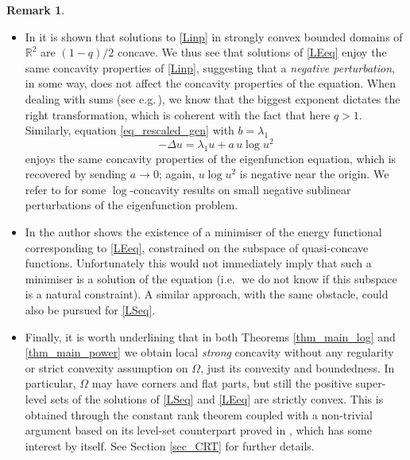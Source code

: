 \documentclass[12pt]{amsart}
\numberwithin{equation}{section}
\theoremstyle{plain}
\theoremstyle{plain}
\theoremstyle{plain}
\theoremstyle{definition}
\newtheorem{remark}[theorem]{Remark}
\newcommand{\R}{{\mathbb R}}
\begin{document}
\begin{remark}
\begin{itemize}[leftmargin=*]
We were not able to prove these properties and resort to a connected subset of $\,]1, 2^*-1[\ \times W^{1,2}_0(\Omega)$ made of general solutions of \eqref{LEeq}, rather than of ground states. 
The latter is obtained through degree methods, see Lemma \ref{lemmaconn}, and all these solutions have local degree $-1$. 
 \item
 In \cite{Lin94} it is shown that solutions to \eqref{Linp} in strongly convex bounded domains of $\R^2$ are $(1-q)/2$ concave.
We thus see that solutions of \eqref{LEeq} enjoy the same concavity properties of \eqref{Linp}, suggesting that a \emph{negative perturbation}, in some way, does not affect the concavity properties of the equation. 
When dealing with sums (see e.g.$\,$\cite[Corollary 6.6]{GaSq25}), we know that the biggest exponent dictates the right transformation, which is coherent with the fact that here $q>1$.
Similarly, equation \eqref{eq_rescaled_gen} 
with $b=\lambda_1$ 
$$-\Delta u = \lambda_1 u + a \, u \log 
u^2$$
 enjoys the same concavity properties of the eigenfunction equation, which is recovered by sending $a \to 0$; again, $u \log u^2$ is negative near the origin. 
We refer to \cite{HaNa25} for some $\log$-concavity results on small negative sublinear perturbations of the eigenfunction problem. 
 \item 
In \cite{Gom07} the author shows the existence of a minimiser of the energy functional corresponding to \eqref{LEeq}, constrained on the subspace of quasi-concave functions. 
Unfortunately this would not immediately imply that such a minimiser is a solution of the equation (i.e.$\;$ we do not know if this subspace is a natural constraint). 
A similar approach, with the same obstacle, could also be pursued for \eqref{LSeq}.
\item
Finally, it is worth underlining that in both Theorems \ref{thm_main_log} and \ref{thm_main_power} we obtain local \emph{strong} concavity without any regularity or strict convexity assumption on $\Omega$, just its convexity and boundedness. 
In particular, $\Omega$ may have corners and flat parts, but still the positive super-level sets of the solutions of \eqref{LSeq} and \eqref{LEeq} are strictly convex.
This is obtained through the constant rank theorem \cite{KoLe87} coupled with a non-trivial argument based on its level-set counterpart proved in \cite{BGMX11}, which has some interest by itself. 
See Section \ref{sec_CRT} for further details. 
\end{itemize}
\end{remark}
\end{document}
